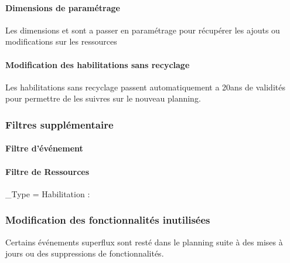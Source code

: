 \documentclass[letterpaper,10pt,english]{sphinxmanual}
\begin{document}
\paragraph{Dimensions de paramétrage}
\label{\detokenize{maj/maj_30092019:dimensions-de-parametrage}}
Les dimensions  et  sont a passer en paramétrage pour récupérer les ajouts ou modifications sur les ressources


\paragraph{Modification des habilitations sans recyclage}
\label{\detokenize{maj/maj_30092019:modification-des-habilitations-sans-recyclage}}
Les habilitations sans recyclage passent automatiquement a 20ans de validités pour permettre de les suivres sur le nouveau planning.


\subsubsection{Filtres supplémentaire}
\label{\detokenize{maj/maj_30092019:filtres-supplementaire}}

\paragraph{Filtre d’événement}
\label{\detokenize{maj/maj_30092019:filtre-d-evenement}}

\paragraph{Filtre de Ressources}
\label{\detokenize{maj/maj_30092019:filtre-de-ressources}}
\_Type = Habilitation :


\subsubsection{Modification des fonctionnalités inutilisées}
\label{\detokenize{maj/maj_30092019:modification-des-fonctionnalites-inutilisees}}
Certains événements superflux sont resté dans le planning suite à des mises à jours ou des suppressions de fonctionnalités.
\end{document}
